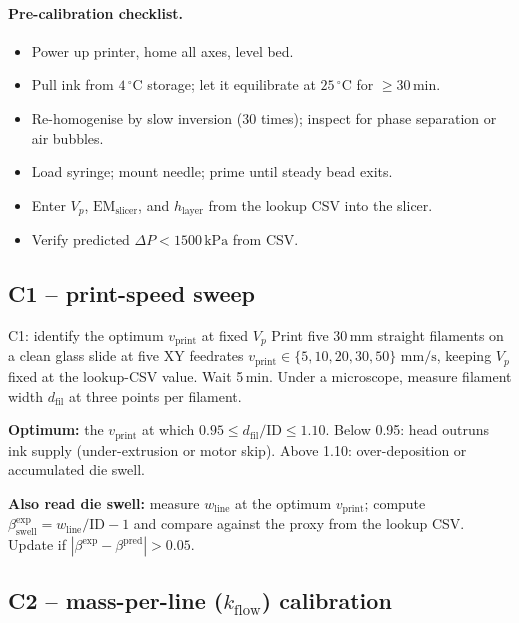 \documentclass[11pt,a4paper]{article}
\newcommand{\mms}{\,\mathrm{mm/s}}
\begin{document}
\paragraph{Pre-calibration checklist.}
\begin{itemize}[leftmargin=1.4em,itemsep=1pt]
\item[$\square$] Power up printer, home all axes, level bed.
\item[$\square$] Pull ink from $4\,^\circ$C storage; let it equilibrate
  at $25\,^\circ$C for $\geq 30\,\si{\minute}$.
\item[$\square$] Re-homogenise by slow inversion (30 times); inspect for
  phase separation or air bubbles.
\item[$\square$] Load syringe; mount needle; prime until steady bead exits.
\item[$\square$] Enter $V_p$, $\mathrm{EM}_\mathrm{slicer}$, and
  $h_\mathrm{layer}$ from the lookup CSV into the slicer.
\item[$\square$] Verify predicted $\Delta P<1500\,\si{\kPa}$ from CSV.
\end{itemize}

\subsection{C1 -- print-speed sweep}

\begin{stepbox}{C1: identify the optimum $v_\mathrm{print}$ at fixed $V_p$}
Print five $30\,\si{\mm}$ straight filaments on a clean glass slide at
five XY feedrates $v_\mathrm{print}\in\{5,10,20,30,50\}\,\mms$, keeping
$V_p$ fixed at the lookup-CSV value. Wait 5\,\si{\minute}. Under a
microscope, measure filament width $d_\mathrm{fil}$ at three points per
filament.

\textbf{Optimum:} the $v_\mathrm{print}$ at which
$0.95\leq d_\mathrm{fil}/\mathrm{ID}\leq 1.10$.
Below 0.95: head outruns ink supply (under-extrusion or motor skip).
Above 1.10: over-deposition or accumulated die swell.

\textbf{Also read die swell:} measure $w_\mathrm{line}$ at the optimum
$v_\mathrm{print}$; compute $\beta_\mathrm{swell}^\mathrm{exp}=
w_\mathrm{line}/\mathrm{ID}-1$ and compare against the proxy from the
lookup CSV. Update if $|\beta^\mathrm{exp}-\beta^\mathrm{pred}|>0.05$.
\end{stepbox}

\subsection{C2 -- mass-per-line ($k_\mathrm{flow}$) calibration}
\end{document}
